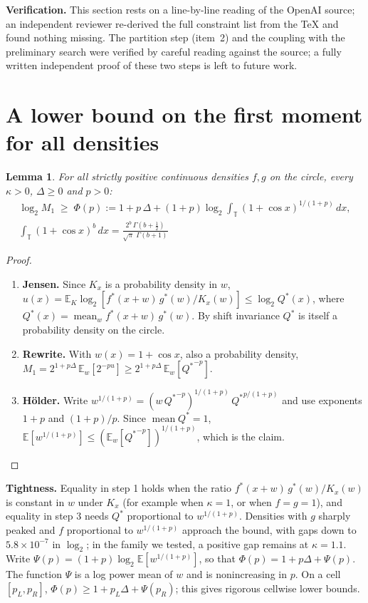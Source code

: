 \documentclass[11pt]{article}
\DeclareMathOperator{\mean}{mean}
\newcommand{\E}{\mathbb{E}}
\theoremstyle{plain}
\newtheorem{lemma}{Lemma}
\begin{document}
\textbf{Verification.} This section rests on a line-by-line reading of the OpenAI source; an independent reviewer re-derived the full constraint list from the \TeX{} and found nothing missing. The partition step (item~2) and the coupling with the preliminary search were verified by careful reading against the source; a fully written independent proof of these two steps is left to future work.

\section{A lower bound on the first moment for all densities}

\begin{lemma}
For all strictly positive continuous densities $f, g$ on the circle, every $\kappa > 0$, $\Delta \ge 0$ and $p > 0$:
\begin{gather*}
\log_2 M_1 \;\ge\; \Phi(p) := 1 + p\,\Delta + (1+p)\log_2 \int_{\mathbb T} (1+\cos x)^{1/(1+p)}\,dx, \\ \int_{\mathbb T} (1+\cos x)^b\,dx = \frac{2^b\,\Gamma(b+\tfrac12)}{\sqrt{\pi}\;\Gamma(b+1)}
\end{gather*}
\end{lemma}

\begin{proof}
\leavevmode
\begin{enumerate}
\item \textbf{Jensen.} Since $K_x$ is a probability density in $w$, $u(x) = \E_K \log_2[f^*(x+w)\, g^*(w) / K_x(w)] \le \log_2 Q^*(x)$, where $Q^*(x) = \mean_w f^*(x+w)\, g^*(w)$. By shift invariance $Q^*$ is itself a probability density on the circle.
\item \textbf{Rewrite.} With $w(x) = 1 + \cos x$, also a probability density, $M_1 = 2^{1+p \Delta}\, \E_w[2^{-p u}] \ge 2^{1+p \Delta}\, \E_w[{Q^*}^{-p}]$.
\item \textbf{H\"older.} Write $w^{1/(1+p)} = (w\, {Q^*}^{-p})^{1/(1+p)}\, {Q^*}^{p/(1+p)}$ and use exponents $1+p$ and $(1+p)/p$. Since $\mean Q^* = 1$, $\E[w^{1/(1+p)}] \le (\E_w[{Q^*}^{-p}])^{1/(1+p)}$, which is the claim. \qedhere
\end{enumerate}
\end{proof}

\textbf{Tightness.} Equality in step 1 holds when the ratio $f^*(x+w)\,g^*(w)/K_x(w)$ is constant in $w$ under $K_x$ (for example when $\kappa = 1$, or when $f = g = 1$), and equality in step 3 needs $Q^*$ proportional to $w^{1/(1+p)}$. Densities with $g$ sharply peaked and $f$ proportional to $w^{1/(1+p)}$ approach the bound, with gaps down to $5.8\times10^{-7}$ in $\log_2$; in the family we tested, a positive gap remains at $\kappa = 1.1$. Write $\Psi(p) = (1+p) \log_2 \E[w^{1/(1+p)}]$, so that $\Phi(p) = 1 + p\Delta + \Psi(p)$. The function $\Psi$ is a log power mean of $w$ and is nonincreasing in $p$. On a cell $[p_L,p_R]$, $\Phi(p)\ge 1+p_L\Delta+\Psi(p_R)$; this gives rigorous cellwise lower bounds.
\end{document}

